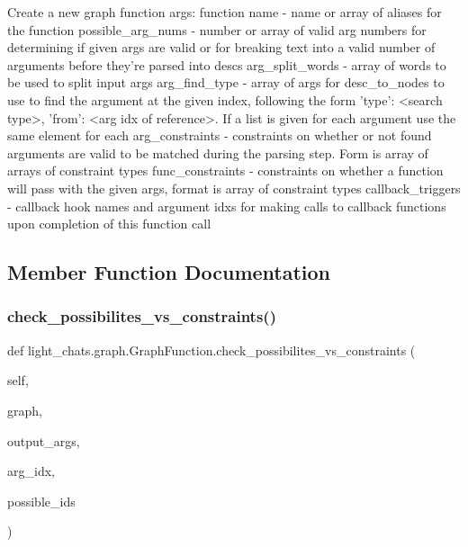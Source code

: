 \begin{DoxyVerb}Create a new graph function
args:
function name - name or array of aliases for the function
possible_arg_nums - number or array of valid arg numbers for
    determining if given args are valid or for breaking text into
    a valid number of arguments before they're parsed into descs
arg_split_words - array of words to be used to split input args
arg_find_type - array of args for desc_to_nodes to use to find the
    argument at the given index, following the form
    {'type': <search type>, 'from': <arg idx of reference>}. If a
    list is given for each argument use the same element for each
arg_constraints - constraints on whether or not found arguments are
    valid to be matched during the parsing step. Form is array of
    arrays of constraint types
func_constraints - constraints on whether a function will pass with
    the given args, format is array of constraint types
callback_triggers - callback hook names and argument idxs for making
    calls to callback functions upon completion of this function call
\end{DoxyVerb}
 

\subsection{Member Function Documentation}
\mbox{\label{classlight__chats_1_1graph_1_1GraphFunction_af627ff84086a094b84da04e30a97779e}} 
\subsubsection{\texorpdfstring{check\+\_\+possibilites\+\_\+vs\+\_\+constraints()}{check\_possibilites\_vs\_constraints()}}
{\footnotesize\ttfamily def light\+\_\+chats.\+graph.\+Graph\+Function.\+check\+\_\+possibilites\+\_\+vs\+\_\+constraints (\begin{DoxyParamCaption}\item[{}]{self,  }\item[{}]{graph,  }\item[{}]{output\+\_\+args,  }\item[{}]{arg\+\_\+idx,  }\item[{}]{possible\+\_\+ids }\end{DoxyParamCaption})}


